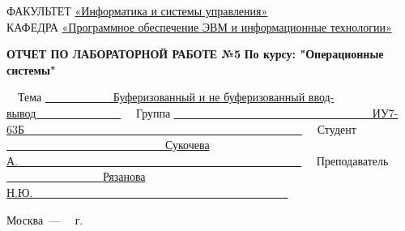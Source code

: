 \begin{titlepage}
{	{\doublespacing \small \raggedright ФАКУЛЬТЕТ \hspace{5mm} \underline{«Информатика и системы управления»}\\
	КАФЕДРА \hspace{10mm} \underline{«Программное обеспечение ЭВМ и информационные технологии»}\\}

	\vspace{20mm}

	\begin{center}
		\noindent\begin{minipage}{1.2\textwidth}\centering
			\textbf{ОТЧЕТ ПО ЛАБОРАТОРНОЙ РАБОТЕ №5}\newline
			\textbf{По курсу: "Операционные системы"}\newline\newline\newline
		\end{minipage}
	\end{center}

	\vspace{20mm}

	\noindent ~~Тема \underline{~~~~~~~~~~~~Буферизованный и не буферизованный ввод-вывод~~~~~~~~~~~~~~~}\newline
	\noindent ~~Группа \underline{~~~~~~~~~~~~~~~~~~~~~~~~~~~~~~~~~~~ИУ7-63Б~~~~~~~~~~~~~~~~~~~~~~~~~~~~~~~~~~~~~~~~~~~~~~~~~}\newline
	\noindent ~~Студент \underline{~~~~~~~~~~~~~~~~~~~~~~~~~~~~Сукочева А.~~~~~~~~~~~~~~~~~~~~~~~~~~~~~~~~~~~~~~~~~~~~~~~~~~}\newline
	\noindent ~~Преподаватель \underline{~~~~~~~~~~~~~~~~~Рязанова Н.Ю.~~~~~~~~~~~~~~~~~~~~~~~~~~~~~~~~~~~~~~~~~~~~~}\newline


	\begin{center}
		\vfill
		Москва~---~\the\year
		~г.
	\end{center}
	}



\end{titlepage}

\setcounter{page}{2}